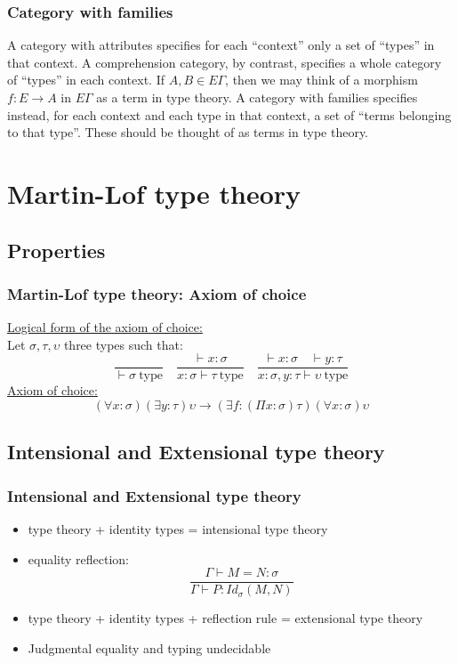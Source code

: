 \documentclass{beamer}
\newcommand{\typ}{\ \mathrm{type}}
\newcommand{\Id}[2]{Id_\sigma(#1,#2)}
\begin{document}
    \begin{frame}
        \frametitle{Category with families}
        A category with attributes specifies for each “context” only a set of “types” in that context. A comprehension category, by contrast, specifies a whole category of “types” in each context. If $A,B \in E \Gamma$, then we may think of a morphism $f:E\to A$ in $E \Gamma$ as a term in type theory.
        A category with families specifies instead, for each context and each type in that context, a set of “terms belonging to that type”. These should be thought of as terms in type theory.
    \end{frame}
    \section{Martin-Lof type theory}
    \subsection{Properties}
    \begin{frame}
        \frametitle{Martin-Lof type theory: Axiom of choice}
        \underline{Logical form of the axiom of choice:}\\
        Let $\sigma, \tau, \upsilon$ three types such that:
        $$\frac{}{\vdash \sigma \typ}\quad\frac{\vdash x:\sigma}{x:\sigma\vdash\tau\typ}\quad\frac{\vdash x:\sigma\quad \vdash y:\tau}{x:\sigma,y:\tau\vdash\upsilon\typ}$$
        \underline{Axiom of choice:}
        $$(\forall x : \sigma) (\exists y : \tau) \upsilon \to (\exists f : (\Pi x : \sigma)\tau)(\forall x : \sigma) \upsilon$$
    \end{frame}
    \subsection{Intensional and Extensional type theory}
    \begin{frame}
        \frametitle{Intensional and Extensional type theory}
        \begin{itemize}
            \item type theory + identity types = intensional type theory
            \item equality reflection:
            $$\frac{\Gamma \vdash M = N : \sigma}{\Gamma \vdash P: \Id{M}{N}}$$
            \item type theory + identity types + reflection rule = extensional type theory
            \item Judgmental equality and typing undecidable
        \end{itemize}
    \end{frame}
\end{document}
